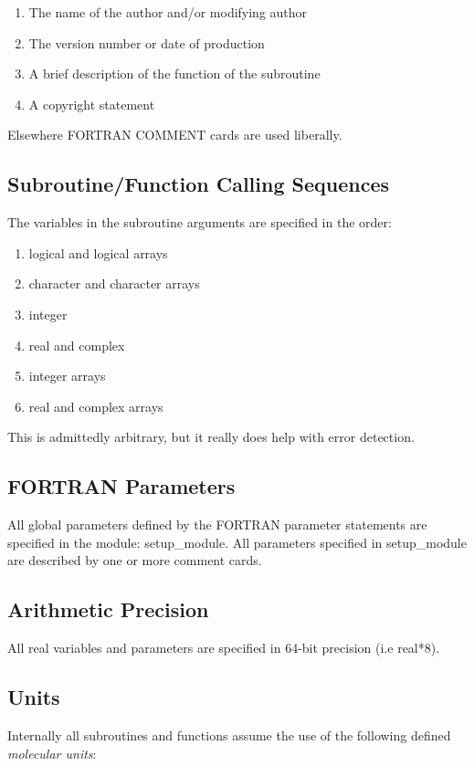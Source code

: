 \begin{enumerate}
\item The name of the author and/or modifying author
\item The version number or date of production
\item A brief description of the function of the subroutine
\item A copyright statement
\end{enumerate}

Elsewhere FORTRAN COMMENT cards are used liberally.

\subsection{Subroutine/Function Calling Sequences}

The variables in the subroutine arguments are specified in the order:

\begin{enumerate}
\item logical and logical arrays
\item character and character arrays
\item integer
\item real and complex
\item integer arrays
\item real and complex arrays
\end{enumerate}

This is admittedly arbitrary, but it really does help with error detection.

\subsection{FORTRAN Parameters}

All global parameters defined by the FORTRAN
parameter statements are specified in the module: {\sc
setup\_module}. All parameters specified in {\sc setup\_module}
are described by one or more comment cards.

\subsection{Arithmetic Precision}

All real variables and parameters are specified in 64-bit precision
(i.e real*8).

\subsection{Units}
\label{units}
Internally all \D{} subroutines and functions assume the use of the
following defined {\em molecular units}:

